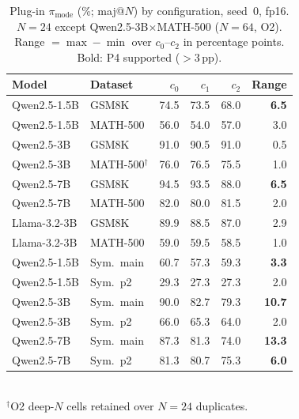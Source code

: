 \documentclass{article}
\newcommand{\pmode}{\pi_{\mathrm{mode}}}
\theoremstyle{plain}
\theoremstyle{definition}
\theoremstyle{remark}
\begin{document}
\begin{table}[t]
\centering
\caption{Plug-in $\pmode$ (\%; maj@$N$) by configuration, seed~$0$, fp16.
$N{=}24$ except Qwen2.5-3B$\times$MATH-500 ($N{=}64$, O2). Range $=\max-\min$
over $c_0$--$c_2$ in percentage points. Bold: P4 supported ($>3$\,pp).}
\label{tab:main-acc}
\small
\setlength{\tabcolsep}{3.5pt}
\begin{tabular}{llrrrr}
\toprule
Model & Dataset & $c_0$ & $c_1$ & $c_2$ & Range \\
\midrule
Qwen2.5-1.5B & GSM8K & 74.5 & 73.5 & 68.0 & \textbf{6.5} \\
Qwen2.5-1.5B & MATH-500 & 56.0 & 54.0 & 57.0 & 3.0 \\
Qwen2.5-3B & GSM8K & 91.0 & 90.5 & 91.0 & 0.5 \\
Qwen2.5-3B & MATH-500$^{\dagger}$ & 76.0 & 76.5 & 75.5 & 1.0 \\
Qwen2.5-7B & GSM8K & 94.5 & 93.5 & 88.0 & \textbf{6.5} \\
Qwen2.5-7B & MATH-500 & 82.0 & 80.0 & 81.5 & 2.0 \\
Llama-3.2-3B & GSM8K & 89.9 & 88.5 & 87.0 & 2.9 \\
Llama-3.2-3B & MATH-500 & 59.0 & 59.5 & 58.5 & 1.0 \\
\midrule
Qwen2.5-1.5B & Sym.\ main & 60.7 & 57.3 & 59.3 & \textbf{3.3} \\
Qwen2.5-1.5B & Sym.\ p2 & 29.3 & 27.3 & 27.3 & 2.0 \\
Qwen2.5-3B & Sym.\ main & 90.0 & 82.7 & 79.3 & \textbf{10.7} \\
Qwen2.5-3B & Sym.\ p2 & 66.0 & 65.3 & 64.0 & 2.0 \\
Qwen2.5-7B & Sym.\ main & 87.3 & 81.3 & 74.0 & \textbf{13.3} \\
Qwen2.5-7B & Sym.\ p2 & 81.3 & 80.7 & 75.3 & \textbf{6.0} \\
\bottomrule
\end{tabular}\\[2pt]
{\footnotesize $^{\dagger}$O2 deep-$N$ cells retained over $N{=}24$ duplicates.}
\end{table}
\end{document}
